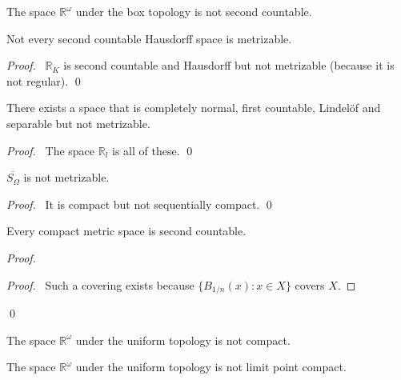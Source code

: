 \begin{cor}
  The space $\mathbb{R}^\omega$ under the box topology is not second countable.
\end{cor}

\begin{prop}
  Not every second countable Hausdorff space is metrizable.
\end{prop}

\begin{proof}
  \pf\ $\mathbb{R}_K$ is second countable and Hausdorff but not metrizable
  (because it is not regular). \qed
\end{proof}

\begin{prop}
  There exists a space that is completely normal, first countable,
  Lindel\"{o}f and separable but not metrizable.
\end{prop}

\begin{proof}
  \pf\ The space $\mathbb{R}_l$ is all of these. \qed
\end{proof}

\begin{prop}
  $\overline{S_\Omega}$ is not metrizable.
\end{prop}

\begin{proof}
  \pf\ It is compact but not sequentially compact. \qed
\end{proof}

\begin{prop}
  Every compact metric space is second countable.
\end{prop}

\begin{proof}
  \pf
  \begin{proof}
    \pf\ Such a covering exists because $\{ B_{1/n}(x) : x \in X\}$ covers $X$.
  \end{proof}
  \qed
\end{proof}

\begin{cor}
  The space $\mathbb{R}^\omega$ under the uniform topology is not compact.
\end{cor}

\begin{cor}
  The space $\mathbb{R}^\omega$ under the uniform topology is not limit
  point compact.
\end{cor}

